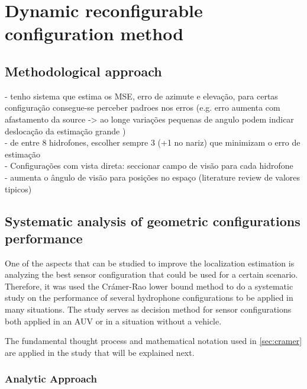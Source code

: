\chapter{Dynamic reconfigurable configuration method}  \label{chap:study}


\section{Methodological approach} \label{sec:config-perf}

- tenho sistema que estima os MSE, erro de azimute e elevação, para certas configuração consegue-se perceber padroes nos erros (e.g. erro aumenta com afastamento da source -> ao longe variações pequenas de angulo podem indicar deslocação da estimação grande )
\\
- de entre 8 hidrofones, escolher sempre 3 (+1 no nariz) que minimizam o erro de estimação
\\
- Configurações com vista direta: seccionar campo de visão para cada hidrofone
\\
- aumenta o ângulo de visão para posições no espaço (literature review de valores tipicos)

\section{Systematic analysis of geometric configurations performance} \label{sec:analysis_config_performance}

One of the aspects that can be studied to improve the localization estimation is analyzing the best sensor configuration that could be used for a certain scenario. Therefore, it was used the Crámer-Rao lower bound method to do a systematic study on the performance of several hydrophone configurations to be applied in many situations. The study serves as decision method for sensor configurations both applied in an AUV or in a situation without a vehicle. 

The fundamental thought process and mathematical notation used in \ref{sec:cramer} are applied in the study that will be explained next.

\subsection{Analytic Approach}  


